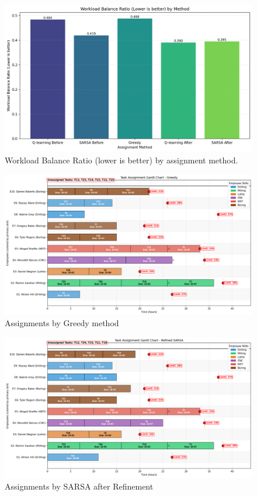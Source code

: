 \documentclass[%
aip,
cp,  %
reprint
]{revtex4-2}
\begin{document}
	\begin{figure}[H]
		\centering
		\includegraphics[width=1\textwidth]{figures/workload_balance_ratio_comparison.png}
		\caption{\label{fig:workload_balance_ratio}Workload Balance Ratio (lower is better) by assignment method.}
	\end{figure}
	
	\begin{figure}[H]
		\centering
		\includegraphics[width=1\textwidth]{figures/gantt_greedy.png}
		\caption{\label{fig:greedy}Assignments by Greedy method}
	\end{figure}
	
	\begin{figure}[H]
		\centering
		\includegraphics[width=1\textwidth]{figures/gantt_sarsa_after.png}
		\caption{\label{fig:sarsa}Assignments by SARSA after Refinement}
	\end{figure}
	
\end{document}
